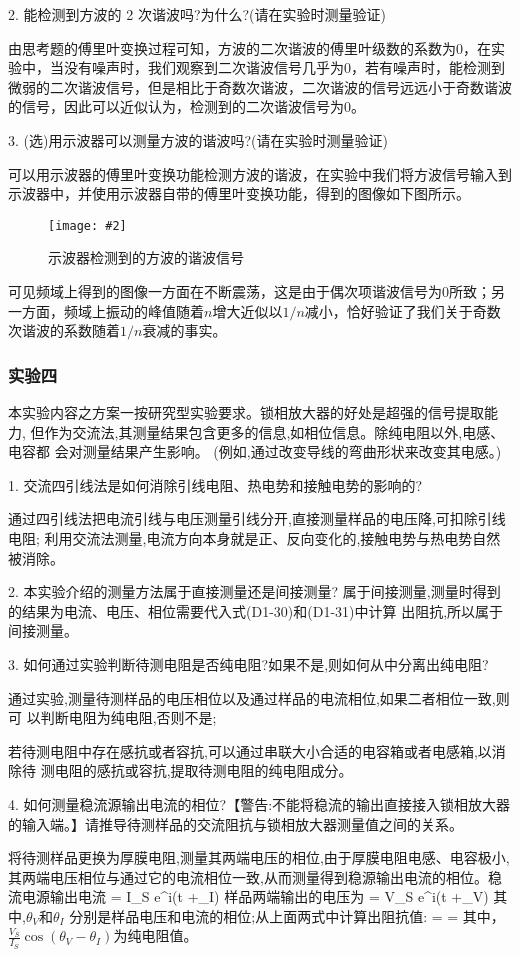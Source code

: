 \documentclass[11pt,a4paper]{ctexart}
\newcommand{\cpic}[2]{
\begin{center}
\texttt{[image: \#2]}
\end{center}
}
\newcommand{\cpicn}[3]
{
\begin{figure}[H]
\cpic{#1}{#2}
\caption{\color{red}#3\label{#2}}
\end{figure}
}
\begin{document}
2. 能检测到方波的 2 次谐波吗?为什么?(请在实验时测量验证)

由思考题的傅里叶变换过程可知，方波的二次谐波的傅里叶级数的系数为0，在实验中，当没有噪声时，我们观察到二次谐波信号几乎为0，若有噪声时，能检测到微弱的二次谐波信号，但是相比于奇数次谐波，二次谐波的信号远远小于奇数谐波的信号，因此可以近似认为，检测到的二次谐波信号为0。

3. (选)用示波器可以测量方波的谐波吗?(请在实验时测量验证)

可以用示波器的傅里叶变换功能检测方波的谐波，在实验中我们将方波信号输入到示波器中，并使用示波器自带的傅里叶变换功能，得到的图像如下图所示。
\cpicn{0.5}{square_wave}{示波器检测到的方波的谐波信号}
可见频域上得到的图像一方面在不断震荡，这是由于偶次项谐波信号为0所致；另一方面，频域上振动的峰值随着$n$增大近似以$1/n$减小，恰好验证了我们关于奇数次谐波的系数随着$1/n$衰减的事实。

\subsubsection{实验四}
本实验内容之方案一按研究型实验要求。锁相放大器的好处是超强的信号提取能力,
但作为交流法,其测量结果包含更多的信息,如相位信息。除纯电阻以外,电感、电容都
会对测量结果产生影响。
(例如,通过改变导线的弯曲形状来改变其电感。)

1. 交流四引线法是如何消除引线电阻、热电势和接触电势的影响的?

通过四引线法把电流引线与电压测量引线分开,直接测量样品的电压降,可扣除引线电阻;
利用交流法测量,电流方向本身就是正、反向变化的,接触电势与热电势自然被消除。

2. 本实验介绍的测量方法属于直接测量还是间接测量?
属于间接测量,测量时得到的结果为电流、电压、相位需要代入式(D1-30)和(D1-31)中计算
出阻抗,所以属于间接测量。

3. 如何通过实验判断待测电阻是否纯电阻?如果不是,则如何从中分离出纯电阻?

通过实验,测量待测样品的电压相位以及通过样品的电流相位,如果二者相位一致,则可
以判断电阻为纯电阻,否则不是;

若待测电阻中存在感抗或者容抗,可以通过串联大小合适的电容箱或者电感箱,以消除待
测电阻的感抗或容抗,提取待测电阻的纯电阻成分。

4. 如何测量稳流源输出电流的相位?【警告:不能将稳流的输出直接接入锁相放大器
  的输入端。】请推导待测样品的交流阻抗与锁相放大器测量值之间的关系。

将待测样品更换为厚膜电阻,测量其两端电压的相位,由于厚膜电阻电感、电容极小,
其两端电压相位与通过它的电流相位一致,从而测量得到稳源输出电流的相位。稳流电源输出电流
\beq
{} = I_S e^{i(\omega t +\theta_I)}
\eeq
样品两端输出的电压为
\beq
{} = V_S  e^{i(\omega t +\theta_V)}
\eeq
其中,$\theta_V$和$\theta_I$ 分别是样品电压和电流的相位;从上面两式中计算出阻抗值:
\beq
{} =  =  
\eeq
其中，$\frac{V_S}{I_S}\cos(\theta_V - \theta_I)$为纯电阻值。
\end{document}
